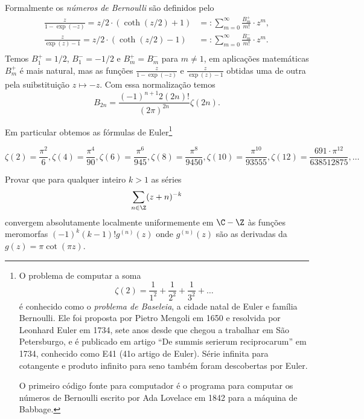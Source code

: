 Formalmente os \emph{números de Bernoulli} são definidos pelo
\begin{align}
\frac{z}{1-\exp(-z)} = z/2 \cdot ( \coth(z/2)+1 ) &=: \sum_{m=0}^\infty \frac{B_m^+}{m!} \cdot z^m, \\
\frac{z}{\exp(z)-1} = z/2 \cdot ( \coth(z/2)-1 ) &=: \sum_{m=0}^\infty \frac{B_m^-}{m!} \cdot z^m. \\
\end{align}
Temos $B_1^+ = 1/2$, $B_1^- = -1/2$ e $B_m^+ = B_m^-$ para $m\neq 1$,
em aplicações matemáticas $B_m^+$ é mais natural,
mas as funções $\frac{z}{1-\exp(-z)}$ e $\frac{z}{\exp(z)-1}$ obtidas uma de outra
pela suibstituição $z\mapsto -z$.
Com essa normalização temos
\begin{equation}
B_{2n} = \frac{(-1)^{n+1} 2 (2n)!}{(2\pi)^{2n}} \zeta(2n).
\end{equation}

Em particular obtemos as fórmulas de Euler\footnote{
O problema de computar a soma
\[ \zeta(2) = \frac{1}{1^2} + \frac{1}{2^2} + \frac{1}{3^2} + \dots \]
é conhecido como o \emph{problema de Baseleia},
a cidade natal de Euler e família Bernoulli.
Ele foi proposta por Pietro Mengoli em 1650 e resolvida
por Leonhard Euler em 1734, sete anos desde que chegou a trabalhar
em São Petersburgo, e é publicado em artigo ``De summis serierum reciprocarum''
em 1734, conhecido como E41 (41o artigo de Euler).
Série infinita para cotangente e produto infinito para seno
também foram descobertas por Euler.

O primeiro código fonte para computador é o programa para computar os números
de Bernoulli escrito por Ada Lovelace em 1842 para a máquina de Babbage.}

\[ \zeta(2)  = \frac{\pi^2}{6},
   \zeta(4)  = \frac{\pi^4}{90},
   \zeta(6)  = \frac{\pi^6}{945},
   \zeta(8)  = \frac{\pi^8}{9450},
   \zeta(10) = \frac{\pi^{10}}{93555},
   \zeta(12) = \frac{691 \cdot \pi^{12}}{638512875},
\dots \]

\begin{problema}
Provar que para qualquer inteiro $k>1$ as séries
\[ \sum_{n\in\Z} (z+n)^{-k} \]
convergem absolutamente localmente uniformemente em $\C-\Z$
às funções meromorfas $(-1)^k (k-1)! g^{(n)}(z)$
onde $g^{(n)}(z)$ são as derivadas da $g(z) = \pi \cot(\pi z)$.
\end{problema}



